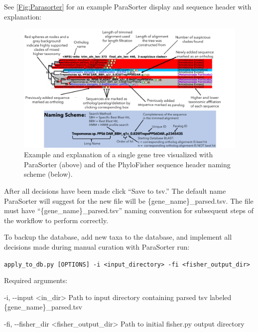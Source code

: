 \documentclass{article}
\def\code#1{\texttt{#1}}
\begin{document}
\begin{enumerate}[itemsep=12pt]
    See \autoref{Fig:Parasorter} for an example ParaSorter display and  sequence header with explanation:
    

        \begin{figure}[H]
        \centering
        \includegraphics[width=\linewidth]{figures/Martin-Figure-AKT.pdf}
        \caption{Example and explanation of a single gene tree visualized with ParaSorter (above) and of the PhyloFisher sequence header naming scheme (below).}
        \label{Fig:Parasorter}
        \end{figure}
        
        After all decisions have been made click “Save to tsv.” The default name ParaSorter will suggest for the new file will be \{gene\_name\}\_parsed.tsv. The file must have “\{gene\_name\}\_parsed.tsv” naming convention for subsequent steps of the workflow to perform correctly.
    \pagebreak
    \item To backup the database, add new taxa to the database, and implement all decisions made during manual curation with ParaSorter run:
   
   \vspace{0.2cm}
    \code{apply\_to\_db.py [OPTIONS] -i <input\_directory> -fi <fisher\_output\_dir>}
    \vspace{0.2cm}
    
    \begin{description}
        \item Required arguments:
        \begin{description}
            \item -i, -\/-input \hspace{0.2cm} <in\_dir> \hspace{0.2cm} Path to input directory containing parsed tsv labeled \{gene\_name\}\_parsed.tsv
            \item -fi, -\/-fisher\_dir \hspace{0.2cm} <fisher\_output\_dir> \hspace{0.2cm} Path to initial fisher.py output directory
        \end{description}
        \vspace{0.2cm}
        

\end{description}
\end{enumerate}
\end{document}
